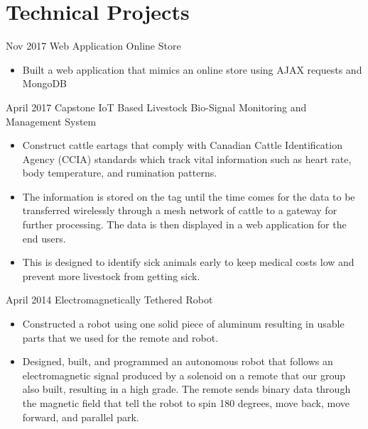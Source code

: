 \documentclass[]{friggeri-cv} %
\begin{document}
\section{Technical Projects}

\begin{entrylist}

\entry
{Nov 2017}
  {Web Application {\normalfont Online Store}}
{}
{
\begin{itemize}
\item Built a web application that mimics an online store using AJAX requests
and MongoDB
\end{itemize}
}
\entry
{April 2017}
{Capstone {\normalfont IoT Based Livestock Bio-Signal Monitoring and Management System}}
{}
{
\begin{itemize}
\item Construct cattle eartags that comply with Canadian Cattle Identification
Agency (CCIA) standards which track vital information such as heart rate, body
temperature, and rumination patterns.
\item The information is stored on the tag until the time comes for the
data to be transferred wirelessly through a mesh network of cattle to a gateway
for further processing. The data is then displayed in a web application for the
end users.
\item This is designed to identify sick animals early to keep medical costs low
and prevent more livestock from getting sick.
\end{itemize}
}
\entry
{April 2014}
{Electromagnetically Tethered Robot}
{}
{
\begin{itemize}
\item Constructed a robot using one solid piece of aluminum resulting in usable
parts that we used for the remote and robot.
\item Designed, built, and programmed an autonomous robot that follows an
electromagnetic signal produced by a
solenoid on a remote that our group also built, resulting in a high grade. The
remote sends binary data through
the magnetic field that tell the robot to spin 180 degrees, move back, move
forward, and parallel park.
\end{itemize}
}
\end{entrylist}

\end{document}
